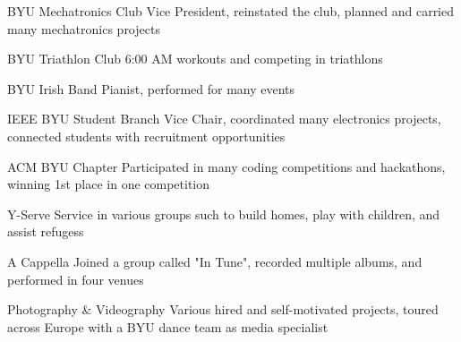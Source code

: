 
\begin{cvskills}


      \cvskill
    {BYU Mechatronics Club} %
    {Vice President, reinstated the club, planned and carried many mechatronics projects} %
    
  \cvskill
    {BYU Triathlon Club} %
    {6:00 AM workouts and competing in triathlons} %

  \cvskill
    {BYU Irish Band} %
    {Pianist, performed for many events} %
    
              \cvskill
    {IEEE BYU Student Branch} %
    {Vice Chair, coordinated many electronics projects, connected students with recruitment opportunities} %
    
          \cvskill
    {ACM BYU Chapter} %
    {Participated in many coding competitions and hackathons, winning 1st place in one competition} %
    
          \cvskill
    {Y-Serve} %
    {Service in various groups such to build homes, play with children, and assist refugess} %
    
      \cvskill
    {A Cappella} %
    {Joined a group called "In Tune", recorded multiple albums, and performed in four venues} %
    
          \cvskill
    {Photography \& Videography} %
    {Various hired and self-motivated projects, toured across Europe with a BYU dance team as media specialist} %


\end{cvskills}
